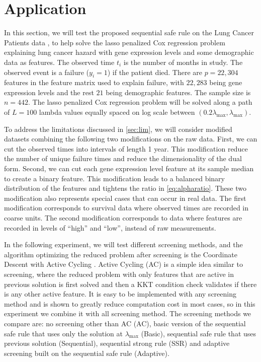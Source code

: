 \section{Application}

In this section, we will test the proposed sequential safe rule on the Lung Cancer Patients data \citep{shedden2008gene}, to help solve the lasso penalized Cox regression problem explaining lung cancer hazard with gene expression levels and some demographic data as features. The observed time $t_i$ is the number of months in study. The observed event is a failure ($y_i=1$) if the patient died. There are $p=22,304$ features in the feature matrix used to explain failure, with $22,283$ being gene expression levels and the rest $21$ being demographic features. The sample size is $n=442$. The lasso penalized Cox regression problem will be solved along a path of $L=100$ lambda values equally spaced on log scale between $(0.2\lambda_{\max},\lambda_{\max})$. 

To address the limitations discussed in \ref{sec:lim}, we will consider modified datasets combining the following two modifications on the raw data. First, we can cut the observed times into intervals of length 1 year. This modification reduce the number of unique failure times and reduce the dimensionality of the dual form. Second, we can cut each gene expression level feature at its sample median to create a binary feature. This modification leads to a balanced binary distribution of the features and tightens the ratio in \eqref{eq:alpharatio}. These two modification also represents special cases that can occur in real data. The first modification corresponds to survival data where observed times are recorded in coarse units. The second modification corresponds to data where features are recorded in levels of ``high'' and ``low'', instead of raw measurements.

In the following experiment, we will test different screening methods, and the algorithm optimizing the reduced problem after screening is the Coordinate Descent \citep{simon2011regularization} with Active Cycling \citep{lee2007efficient}. Active Cycling (AC) is a simple idea similar to screening, where the reduced problem with only features that are active in previous solution is first solved and then a KKT condition check validates if there is any other active feature. It is easy to be implemented with any screening method and is shown to greatly reduce computation cost in most cases, so in this experiment we combine it with all screening method. The screening methods we compare are: no screening other than AC (AC), basic version of the sequential safe rule that uses only the solution at $\lambda_{\max}$ (Basic), sequential safe rule that uses previous solution (Sequential), sequential strong rule (SSR) and adaptive screening built on the sequential safe rule (Adaptive).

